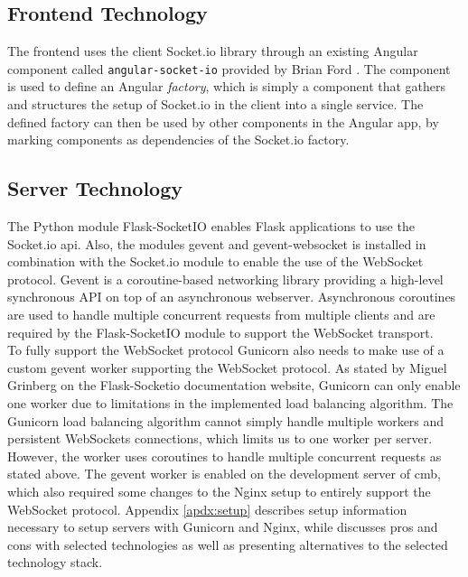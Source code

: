 \subsection{Frontend Technology}
\label{sub-sec:real-time-frontend}
The frontend uses the client Socket.io library \cite{SOCKETIO} through an existing Angular component called \texttt{angular-socket-io} provided by Brian Ford \cite{ANGULARSOCKETIO}. The component is used to define an Angular \textit{factory}, which is simply a component that gathers and structures the setup of Socket.io in the client into a single service. The defined factory can then be used by other components in the Angular app, by marking components as dependencies of the Socket.io factory. \\

\subsection{Server Technology}
\label{sub-sec:real-time-server}
The Python module Flask-SocketIO \cite{FLASKSOCKETIO} enables Flask applications to use the Socket.io \gls{api}. Also, the modules gevent \cite{GEVENT} and gevent-websocket \cite{GEVENTWEBSOCKET}  is installed in combination with the Socket.io module to enable the use of the WebSocket protocol. Gevent is a coroutine-based networking library providing a high-level synchronous API on top of an asynchronous webserver. Asynchronous coroutines are used to handle multiple concurrent requests from multiple clients and are required by the Flask-SocketIO module to support the WebSocket transport. \\

To fully support the WebSocket protocol Gunicorn also needs to make use of a custom gevent worker supporting the WebSocket protocol. As stated by Miguel Grinberg on the Flask-Socketio documentation website, Gunicorn can only enable one worker due to limitations in the implemented load balancing algorithm. The Gunicorn load balancing algorithm cannot simply handle multiple workers and persistent WebSockets connections, which limits us to one worker per server. However, the worker uses coroutines to handle multiple concurrent requests as stated above. The gevent worker is enabled on the development server of \gls{cmb}, which also required some changes to the Nginx setup to entirely support the WebSocket protocol. Appendix \ref{apdx:setup} describes setup information necessary to setup servers with Gunicorn and Nginx, while  discusses pros and cons with selected technologies as well as presenting alternatives to the selected technology stack.

